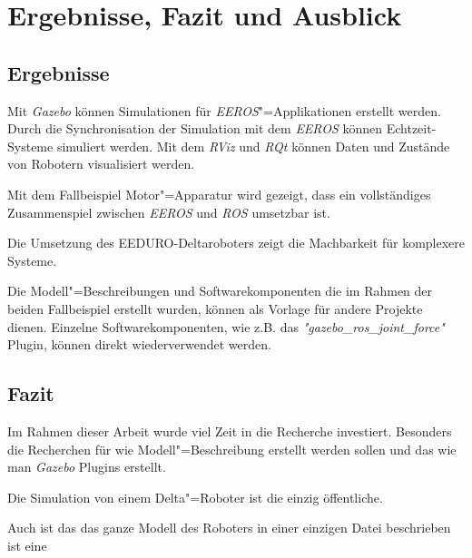 \chapter{Ergebnisse, Fazit und Ausblick}

\section{Ergebnisse}

Mit \textit{Gazebo} können Simulationen für \textit{EEROS}"=Applikationen erstellt werden.
Durch die Synchronisation der Simulation mit dem \textit{EEROS} können Echtzeit-Systeme simuliert werden.
Mit dem \textit{RViz} und \textit{RQt} können Daten und Zustände von Robotern visualisiert werden.


Mit dem Fallbeispiel Motor"=Apparatur wird gezeigt, dass ein vollständiges Zusammenspiel zwischen \textit{EEROS} und \textit{ROS} umsetzbar ist.

Die Umsetzung des EEDURO-Deltaroboters zeigt die Machbarkeit für komplexere Systeme.

Die Modell"=Beschreibungen und Softwarekomponenten die im Rahmen der beiden Fallbeispiel erstellt wurden, können als Vorlage für andere Projekte dienen.
Einzelne Softwarekomponenten, wie z.B. das \textit{"gazebo\_ros\_joint\_force"} Plugin, können direkt wiederverwendet werden. 



\section{Fazit}
Im Rahmen dieser Arbeit wurde viel Zeit in die Recherche investiert.
Besonders die Recherchen für wie Modell"=Beschreibung erstellt werden sollen und das wie man \textit{Gazebo} Plugins erstellt.

Die Simulation von einem Delta"=Roboter ist die einzig öffentliche.

Auch ist das das ganze Modell des Roboters in einer einzigen Datei beschrieben ist eine  


